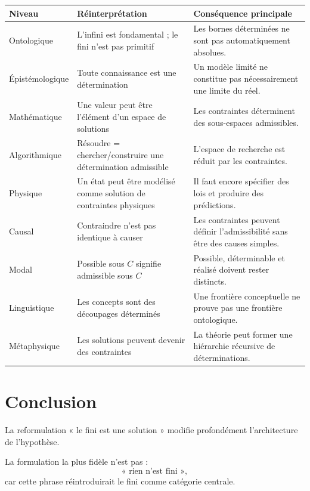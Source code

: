 \documentclass[11pt,a4paper]{article}
\begin{document}
\begin{center}
\begin{tabular}{>{\raggedright\arraybackslash}p{}
                >{\raggedright\arraybackslash}p{}
                >{\raggedright\arraybackslash}p{}}
\toprule
Niveau & Réinterprétation & Conséquence principale\\
\midrule
Ontologique & L'infini est fondamental ; le fini n'est pas primitif &
Les bornes déterminées ne sont pas automatiquement absolues.\\
Épistémologique & Toute connaissance est une détermination &
Un modèle limité ne constitue pas nécessairement une limite du réel.\\
Mathématique & Une valeur peut être l'élément d'un espace de solutions &
Les contraintes déterminent des sous-espaces admissibles.\\
Algorithmique & Résoudre = chercher/construire une détermination admissible &
L'espace de recherche est réduit par les contraintes.\\
Physique & Un état peut être modélisé comme solution de contraintes physiques &
Il faut encore spécifier des lois et produire des prédictions.\\
Causal & Contraindre n'est pas identique à causer &
Les contraintes peuvent définir l'admissibilité sans être des causes simples.\\
Modal & Possible sous \(C\) signifie admissible sous \(C\) &
Possible, déterminable et réalisé doivent rester distincts.\\
Linguistique & Les concepts sont des découpages déterminés &
Une frontière conceptuelle ne prouve pas une frontière ontologique.\\
Métaphysique & Les solutions peuvent devenir des contraintes &
La théorie peut former une hiérarchie récursive de déterminations.\\
\bottomrule
\end{tabular}
\end{center}

\section{Conclusion}

La reformulation « le fini est une solution » modifie profondément
l'architecture de l'hypothèse.

La formulation la plus fidèle n'est pas :
\[
\text{« rien n'est fini »},
\]
car cette phrase réintroduirait le fini comme catégorie centrale.
\end{document}
